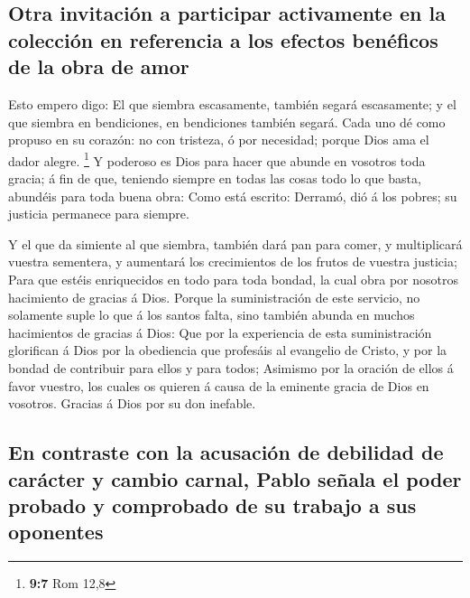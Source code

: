 \hypertarget{otra-invitaciuxf3n-a-participar-activamente-en-la-colecciuxf3n-en-referencia-a-los-efectos-benuxe9ficos-de-la-obra-de-amor}{%
\subsection{Otra invitación a participar activamente en la colección en
referencia a los efectos benéficos de la obra de
amor}\label{otra-invitaciuxf3n-a-participar-activamente-en-la-colecciuxf3n-en-referencia-a-los-efectos-benuxe9ficos-de-la-obra-de-amor}}

 Esto empero digo: El que siembra escasamente, también
segará escasamente; y el que siembra en bendiciones, en bendiciones
también segará.  Cada uno dé como propuso en su corazón:
no con tristeza, ó por necesidad; porque Dios ama el dador alegre.
\footnote{\textbf{9:7} Rom 12,8}  Y poderoso es Dios para
hacer que abunde en vosotros toda gracia; á fin de que, teniendo siempre
en todas las cosas todo lo que basta, abundéis para toda buena obra:
 Como está escrito: Derramó, dió á los pobres; su justicia
permanece para siempre.

 Y el que da simiente al que siembra, también dará pan
para comer, y multiplicará vuestra sementera, y aumentará los
crecimientos de los frutos de vuestra justicia;  Para que
estéis enriquecidos en todo para toda bondad, la cual obra por nosotros
hacimiento de gracias á Dios.  Porque la suministración
de este servicio, no solamente suple lo que á los santos falta, sino
también abunda en muchos hacimientos de gracias á Dios: 
Que por la experiencia de esta suministración glorifican á Dios por la
obediencia que profesáis al evangelio de Cristo, y por la bondad de
contribuir para ellos y para todos;  Asimismo por la
oración de ellos á favor vuestro, los cuales os quieren á causa de la
eminente gracia de Dios en vosotros.  Gracias á Dios por
su don inefable.

\hypertarget{en-contraste-con-la-acusaciuxf3n-de-debilidad-de-caruxe1cter-y-cambio-carnal-pablo-seuxf1ala-el-poder-probado-y-comprobado-de-su-trabajo-a-sus-oponentes}{%
\subsection{En contraste con la acusación de debilidad de carácter y
cambio carnal, Pablo señala el poder probado y comprobado de su trabajo
a sus
oponentes}\label{en-contraste-con-la-acusaciuxf3n-de-debilidad-de-caruxe1cter-y-cambio-carnal-pablo-seuxf1ala-el-poder-probado-y-comprobado-de-su-trabajo-a-sus-oponentes}}

